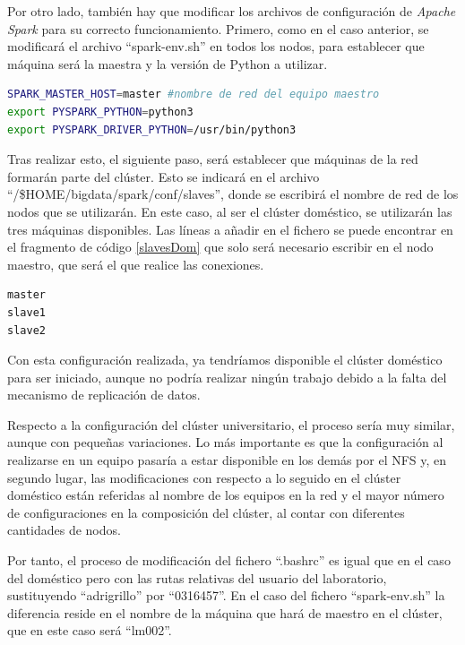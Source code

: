 Por otro lado, también hay que modificar los archivos de configuración de \textit{Apache Spark} para su correcto funcionamiento. Primero, como en el caso anterior, se modificará el archivo ``spark-env.sh'' en todos los nodos, para establecer que máquina será la maestra y la versión de Python a utilizar.

\begin{lstlisting}[label=envCluster,language=sh,frame=single,caption=Líneas a añadir en el fichero ``spark-env.sh'' para configurar \textit{Apache Spark} en el modo distribuido]
SPARK_MASTER_HOST=master #nombre de red del equipo maestro
export PYSPARK_PYTHON=python3
export PYSPARK_DRIVER_PYTHON=/usr/bin/python3
\end{lstlisting}

Tras realizar esto, el siguiente paso, será establecer que máquinas de la red formarán parte del clúster. Esto se indicará en el archivo ``/\$HOME/bigdata/spark/conf/slaves'', donde se escribirá el nombre de red de los nodos que se utilizarán. En este caso, al ser el clúster doméstico, se utilizarán las tres máquinas disponibles. Las líneas a añadir en el fichero se puede encontrar en el fragmento de código \ref{slavesDom} que solo será necesario escribir en el nodo maestro, que será el que realice las conexiones.

\begin{lstlisting}[label=slavesDom,language=sh,frame=single,caption=Líneas a añadir en el fichero ``slaves'' para establecer las máquinas a utilizar en el clúster doméstico]
master
slave1
slave2
\end{lstlisting}

Con esta configuración realizada, ya tendríamos disponible el clúster doméstico para ser iniciado, aunque no podría realizar ningún trabajo debido a la falta del mecanismo de replicación de datos.

Respecto a la configuración del clúster universitario, el proceso sería muy similar, aunque con pequeñas variaciones. Lo más importante es que la configuración al realizarse en un equipo pasaría a estar disponible en los demás por el \gls{NFS} y, en segundo lugar, las modificaciones con respecto a lo seguido en el clúster doméstico están referidas al nombre de los equipos en la red y el mayor número de configuraciones en la composición del clúster, al contar con diferentes cantidades de nodos.

Por tanto, el proceso de modificación del fichero ``.bashrc'' es igual que en el caso del doméstico pero con las rutas relativas del usuario del laboratorio, sustituyendo ``adrigrillo'' por ``0316457''. En el caso del fichero ``spark-env.sh'' la diferencia reside en el nombre de la máquina que hará de maestro en el clúster, que en este caso será ``lm002''.

